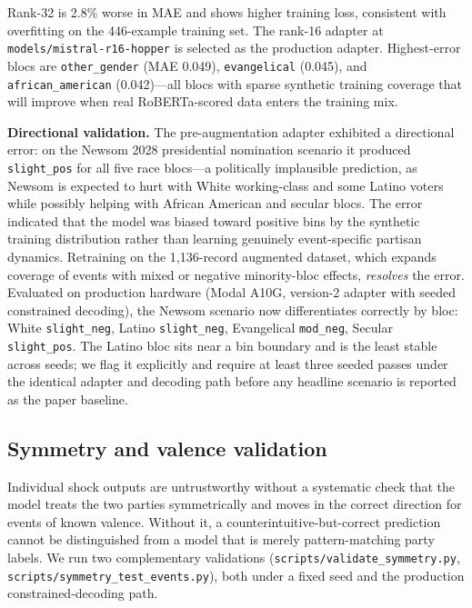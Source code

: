 \documentclass[12pt, letterpaper]{article}
\theoremstyle{definition}
\begin{document}
Rank-32 is 2.8\% worse in MAE and shows higher training loss, consistent with
overfitting on the 446-example training set. The rank-16 adapter at
\texttt{models/mistral-r16-hopper} is selected as the production adapter.
Highest-error blocs are \texttt{other\_gender} (MAE 0.049), \texttt{evangelical}
(0.045), and \texttt{african\_american} (0.042)---all blocs with sparse
synthetic training coverage that will improve when real RoBERTa-scored data
enters the training mix.

\textbf{Directional validation.} The pre-augmentation adapter exhibited a
directional error: on the Newsom 2028 presidential nomination scenario it produced
\texttt{slight\_pos} for all five race blocs---a politically implausible prediction,
as Newsom is expected to hurt with White working-class and some Latino voters while
possibly helping with African American and secular blocs. The error indicated that
the model was biased toward positive bins by the synthetic training distribution
rather than learning genuinely event-specific partisan dynamics. Retraining on the
1,136-record augmented dataset, which expands coverage of events with mixed or
negative minority-bloc effects, \emph{resolves} the error. Evaluated on production
hardware (Modal A10G, version-2 adapter with seeded constrained decoding), the Newsom
scenario now differentiates correctly by bloc: White \texttt{slight\_neg}, Latino
\texttt{slight\_neg}, Evangelical \texttt{mod\_neg}, Secular \texttt{slight\_pos}. The
Latino bloc sits near a bin boundary and is the least stable across seeds; we flag it
explicitly and require at least three seeded passes under the identical adapter and
decoding path before any headline scenario is reported as the paper baseline.

\subsection{Symmetry and valence validation}
\label{sec:symmetry_methods}

Individual shock outputs are untrustworthy without a systematic check that the model
treats the two parties symmetrically and moves in the correct direction for events of
known valence. Without it, a counterintuitive-but-correct prediction cannot be
distinguished from a model that is merely pattern-matching party labels. We run two
complementary validations (\texttt{scripts/validate\_symmetry.py},
\texttt{scripts/symmetry\_test\_events.py}), both under a fixed seed and the production
constrained-decoding path.
\end{document}
